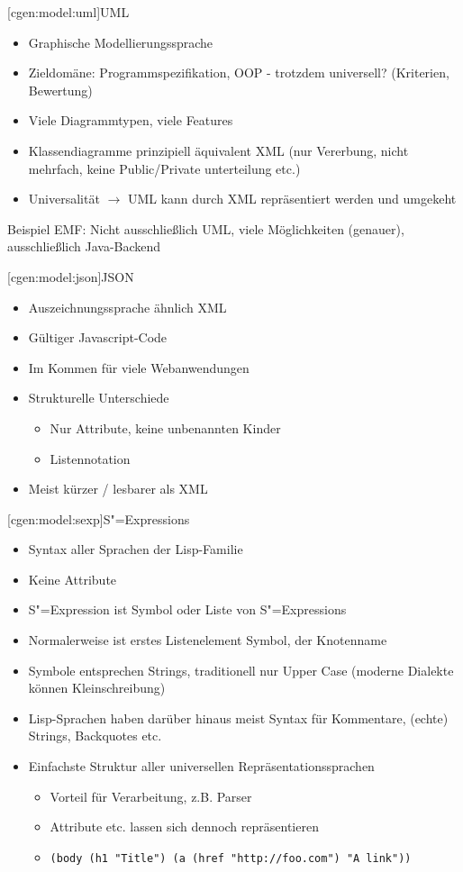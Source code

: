 \documentclass[a4paper, bibgerm]{book}
\newcommand\icode[1]{\lstinline?#1?}
\newcommand\lsubsection{}
\newcommand{\sexp}{S"=Expression}
\newcommand{\sexps}{S"=Expressions}
\begin{document}
\lsubsection[cgen:model:uml]{UML}

\begin{itemize}
\item Graphische Modellierungssprache
\item Zieldomäne: Programmspezifikation, OOP - trotzdem universell?  (Kriterien, Bewertung)
\item Viele Diagrammtypen, viele Features
\item Klassendiagramme prinzipiell äquivalent XML (nur Vererbung, nicht
  mehrfach, keine Public/Private unterteilung etc.)
\item Universalität $\rightarrow$ UML kann durch XML repräsentiert werden und umgekeht
\end{itemize}

Beispiel EMF: Nicht ausschließlich UML, viele Möglichkeiten (genauer), ausschließlich Java-Backend

\lsubsection[cgen:model:json]{JSON}

\begin{itemize}
\item Auszeichnungssprache ähnlich XML
\item Gültiger Javascript-Code
\item Im Kommen für viele Webanwendungen
\item Strukturelle Unterschiede
  \begin{itemize}
  \item Nur Attribute, keine unbenannten Kinder
  \item Listennotation
  \end{itemize}
\item Meist kürzer / lesbarer als XML
\end{itemize}

\lsubsection[cgen:model:sexp]{\sexps}

\begin{itemize}
\item Syntax aller Sprachen der Lisp-Familie
\item Keine Attribute
\item \sexp{} ist Symbol oder Liste von \sexps{}
\item Normalerweise ist erstes Listenelement Symbol, der Knotenname
\item Symbole entsprechen Strings, traditionell nur Upper Case (moderne Dialekte können Kleinschreibung)
\item Lisp-Sprachen haben darüber hinaus meist Syntax für Kommentare, (echte)
  Strings, Backquotes etc.
\item Einfachste Struktur aller universellen Repräsentationssprachen
  \begin{itemize}
  \item Vorteil für Verarbeitung, z.B. Parser
  \item Attribute etc. lassen sich dennoch repräsentieren
  \item \icode{(body (h1 "Title") (a (href "http://foo.com") "A link"))}
  \end{itemize}
\end{itemize}
\end{document}
